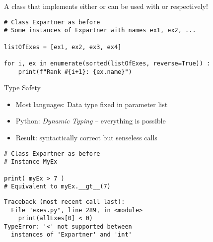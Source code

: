 
\begin{frame}[fragile]
%
\begin{hintbox}
A class that implements either  or  can be used with  or  respectively!
\end{hintbox}
%
\begin{codebox}
\begin{verbatim}
# Class Expartner as before
# Some instances of Expartner with names ex1, ex2, ...

listOfExes = [ex1, ex2, ex3, ex4]

for i, ex in enumerate(sorted(listOfExes, reverse=True)) :
    print(f"Rank #{i+1}: {ex.name}")
\end{verbatim}
\end{codebox}
%
\end{frame}


\begin{frame}[fragile]{Type Safety}
%
\begin{itemize}
\item Most languages: Data type fixed in parameter list
\item Python: \emph{Dynamic Typing} -- everything is possible
\item Result: syntactically correct but senseless calls
\end{itemize}
%
\begin{tcbraster}[raster columns=2,
                  raster equal height,
                  nobeforeafter,
                  raster column skip=0.5cm]
\begin{codebox}
\begin{verbatim}
# Class Expartner as before
# Instance MyEx

print( myEx > 7 )
# Equivalent to myEx.__gt__(7)
\end{verbatim}
\end{codebox}
%
\begin{cmdbox}
\begin{verbatim}
Traceback (most recent call last):
  File "exes.py", line 289, in <module>
    print(allExes[0] < 0)
TypeError: '<' not supported between
  instances of 'Expartner' and 'int'
\end{verbatim}
\end{cmdbox}
\end{tcbraster}
%
\end{frame}

